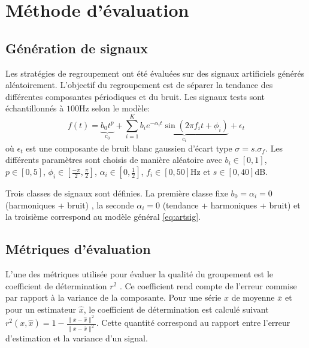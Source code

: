 \documentclass{gretsi}
\newcommand{\inter}{\left[0, 1\right]}
\begin{document}
\section{Méthode d'évaluation}
\label{sec:eval}
\subsection{Génération de signaux}
\label{sub:artsig}
    Les stratégies de regroupement ont été évaluées sur des signaux artificiels générés aléatoirement.
    L'objectif du regroupement est de séparer la tendance des différentes composantes périodiques et du bruit. Les signaux tests sont échantillonnés à $100$Hz selon le modèle:
    \begin{equation}\label{eq:artsig}
    f(t) = \underbrace{b_0 t^p}_{c_0} + \sum_{i=1}^K \underbrace{b_i e^{-\alpha_i t} \sin\left(2\pi f_i t + \phi_i\right)}_{c_i} + \epsilon_t
    \end{equation}
    où $\epsilon_t$  est une composante de bruit blanc gaussien d'écart type $\sigma = s.\sigma_f$.
    Les différents paramètres sont choisis de manière aléatoire avec $b_i \in \inter$, $p \in \left[0, 5\right]$, $\displaystyle \phi_i \in\left[\frac{-\pi}{2}, \frac{\pi}{2}\right]$, $\alpha_i \in \left[0, \frac{1}{2}\right]$, $f_i \in \left[0, 50\right]$Hz et $s \in \left[0, 40\right]$dB.
   
    Trois classes de signaux sont définies.
    La première classe fixe $b_0 = \alpha_i = 0$ (harmoniques + bruit) , la seconde $\alpha_i = 0$ (tendance + harmoniques + bruit) et la troisième correspond au modèle général \eqref{eq:artsig}.

\vspace{-.2cm}
\subsection{Métriques d'évaluation}
\label{sub:met}

    L'une des métriques utilisée pour évaluer la qualité du groupement est le coefficient de détermination $r^2$ \cite{abalov_14_auto}.
    Ce coefficient rend compte de l'erreur commise par rapport à la variance de la composante.
    Pour une série $x$ de moyenne $\overline x$ et pour un estimateur $\widehat x$, le coefficient de détermination est calculé suivant $r^2(x, \widehat x) = 1 - \frac{\|x-\widehat x\|^2}{\|x-\overline x\|^2}$.
    Cette quantité correspond au rapport entre l'erreur d'estimation et la variance d'un signal.
\end{document}
